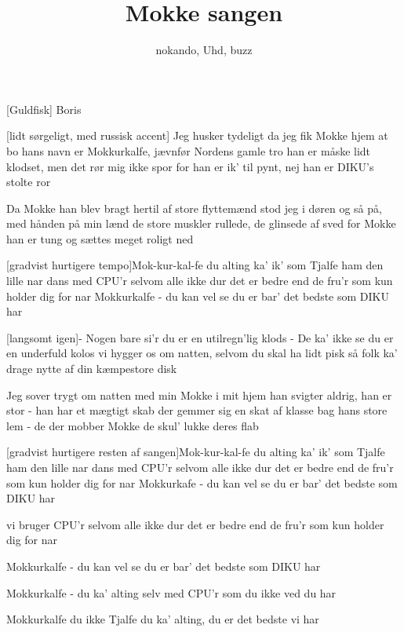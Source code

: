 \documentclass[a4paper,11pt]{article}
\title{Mokke sangen}
\author{nokando, Uhd, buzz}
\begin{document}
\maketitle

\begin{roles}
[Guldfisk] Boris
\end{roles}

\begin{props}
\prop{}
\end{props}

  
\begin{song}
  
[lidt sørgeligt, med russisk accent]
Jeg husker tydeligt da jeg fik Mokke hjem at bo 
hans navn er Mokkurkalfe, jævnfør Nordens gamle tro 
han er måske lidt klodset, men det rør mig ikke spor 
for han er ik' til pynt, nej han er DIKU's stolte ror
  
Da Mokke han blev bragt hertil af store flyttemænd 
stod jeg i døren og så på, med hånden på min lænd 
de store muskler rullede, de glinsede af sved 
for Mokke han er tung og sættes meget roligt ned

[gradvist hurtigere tempo]Mok-kur-kal-fe
du alting ka'
ik' som Tjalfe
ham den lille nar
dans med CPU'r 
selvom alle ikke dur
det er bedre end de fru'r 
som kun holder dig for nar
Mokkurkalfe
- du kan vel se
du er bar' det bedste som DIKU har

[langsomt igen]- Nogen bare si'r du er en utilregn'lig klods
- De ka' ikke se du er en underfuld kolos
vi hygger os om natten, selvom du skal ha lidt pisk
så folk ka' drage nytte af din kæmpestore disk

Jeg sover trygt om natten med min Mokke i mit hjem
han svigter aldrig, han er stor - han har et mægtigt skab
der gemmer sig en skat af klasse bag hans store lem
- de der mobber Mokke de skul' lukke deres flab

[gradvist hurtigere resten af sangen]Mok-kur-kal-fe
du alting ka'
ik' som Tjalfe
ham den lille nar
dans med CPU'r 
selvom alle ikke dur
det er bedre end de fru'r 
som kun holder dig for nar
Mokkurkafe
- du kan vel se
du er bar' det bedste som DIKU har

vi bruger CPU'r 
selvom alle ikke dur
det er bedre end de fru'r 
som kun holder dig for nar

Mokkurkalfe
- du kan vel se
du er bar' det bedste som DIKU har

Mokkurkalfe
- du ka' alting
selv med CPU'r som du ikke ved du har

Mokkurkalfe
du ikke Tjalfe
du ka' alting, du er det bedste vi har


\end{song}
\end{document}
